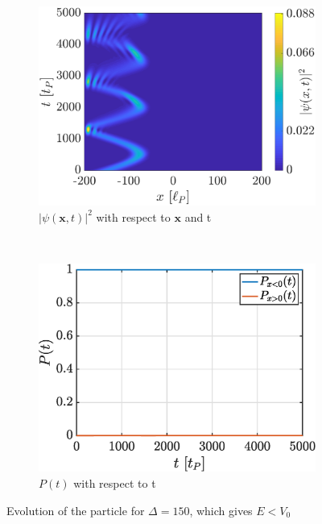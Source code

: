 \documentclass[a4paper,12pt,twoside]{article}
\newcommand{\mbf}[1]{\mathbf{#1}} %
\begin{document}
\begin{figure}[h]
  \centering
  \begin{subfigure}[t]{0.45\textwidth}
    \includegraphics[width=\textwidth]{graphs/iii_evo_Eleqv0_evo.eps}
    \caption{$|\psi(\mbf{x}, t)|^2$ with respect to $\mbf{x}$ and t}
    \label{fig:iii_evo_Eleqv0_evo}
  \end{subfigure}
  ~
  \begin{subfigure}[t]{0.45\textwidth}
    \includegraphics[width=\textwidth]{graphs/iii_evo_Eleqv0_prob.eps}
    \caption{$P(t)$ with respect to t}
    \label{fig:iii_evo_Eleqv0_prob}
  \end{subfigure}
  \caption{Evolution of the particle for $\Delta = 150$, which gives $E < V_0$}
  \label{fig:iii_evo_Eleqv0}
\end{figure}
\end{document}
